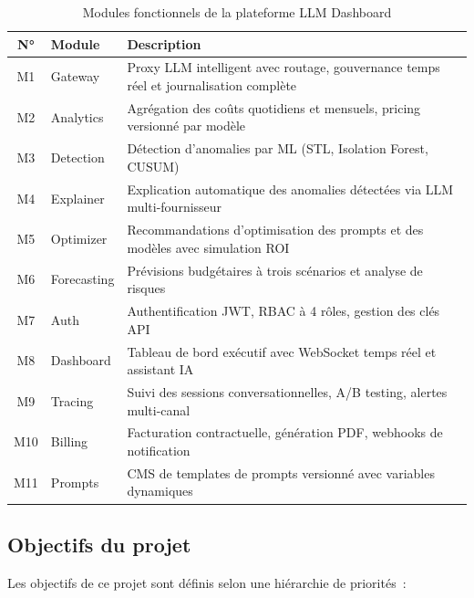 \begin{table}[H]
\centering
\caption{Modules fonctionnels de la plateforme LLM Dashboard}
\label{tab:modules}
\begin{tabularx}{\textwidth}{|c|l|X|}
\hline
\textbf{N°} & \textbf{Module} & \textbf{Description} \\
\hline
M1 & Gateway & Proxy LLM intelligent avec routage, gouvernance temps réel et journalisation complète \\
\hline
M2 & Analytics & Agrégation des coûts quotidiens et mensuels, pricing versionné par modèle \\
\hline
M3 & Detection & Détection d'anomalies par ML (STL, Isolation Forest, CUSUM) \\
\hline
M4 & Explainer & Explication automatique des anomalies détectées via LLM multi-fournisseur \\
\hline
M5 & Optimizer & Recommandations d'optimisation des prompts et des modèles avec simulation ROI \\
\hline
M6 & Forecasting & Prévisions budgétaires à trois scénarios et analyse de risques \\
\hline
M7 & Auth & Authentification JWT, RBAC à 4 rôles, gestion des clés API \\
\hline
M8 & Dashboard & Tableau de bord exécutif avec WebSocket temps réel et assistant IA \\
\hline
M9 & Tracing & Suivi des sessions conversationnelles, A/B testing, alertes multi-canal \\
\hline
M10 & Billing & Facturation contractuelle, génération PDF, webhooks de notification \\
\hline
M11 & Prompts & CMS de templates de prompts versionné avec variables dynamiques \\
\hline
\end{tabularx}
\end{table}


\subsection{Objectifs du projet}

Les objectifs de ce projet sont définis selon une hiérarchie de priorités~:

